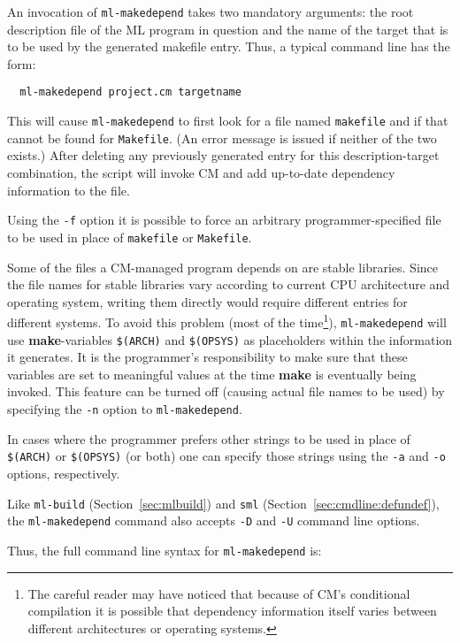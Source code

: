 \documentclass[titlepage,letterpaper]{article}
\begin{document}
An invocation of {\tt ml-makedepend} takes two mandatory arguments:
the root description file of the ML program in question and the name
of the target that is to be used by the generated makefile entry.
Thus, a typical command line has the form:

\begin{verbatim}
  ml-makedepend project.cm targetname
\end{verbatim}

This will cause {\tt ml-makedepend} to first look for a file named
{\tt makefile} and if that cannot be found for {\tt Makefile}.  (An
error message is issued if neither of the two exists.)  After deleting
any previously generated entry for this description-target
combination, the script will invoke CM and add up-to-date dependency
information to the file.

Using the {\tt -f} option it is possible to force an arbitrary
programmer-specified file to be used in place of {\tt makefile} or
{\tt Makefile}.

Some of the files a CM-managed program depends on are stable
libraries.  Since the file names for stable libraries vary according
to current CPU architecture and operating system, writing them
directly would require different entries for different systems.  To
avoid this problem (most of the time\footnote{The careful reader may
have noticed that because of CM's conditional compilation it is
possible that dependency information itself varies between different
architectures or operating systems.}), {\tt ml-makedepend} will use
{\bf make}-variables {\tt \$(ARCH)} and {\tt \$(OPSYS)} as
placeholders within the information it generates.  It is the
programmer's responsibility to make sure that these variables are set
to meaningful values at the time {\bf make} is eventually being
invoked.  This feature can be turned off (causing actual file names to
be used) by specifying the {\tt -n} option to {\tt ml-makedepend}.

In cases where the programmer prefers other strings to be used in
place of {\tt \$(ARCH)} or {\tt \$(OPSYS)} (or both) one can specify
those strings using the {\tt -a} and {\tt -o} options, respectively.

Like {\tt ml-build} (Section~\ref{sec:mlbuild}) and {\tt sml}
(Section~\ref{sec:cmdline:defundef}), the {\tt ml-makedepend} command
also accepts {\tt -D} and {\tt -U} command line options.

Thus, the full command line syntax for {\tt ml-makedepend} is:
\end{document}

